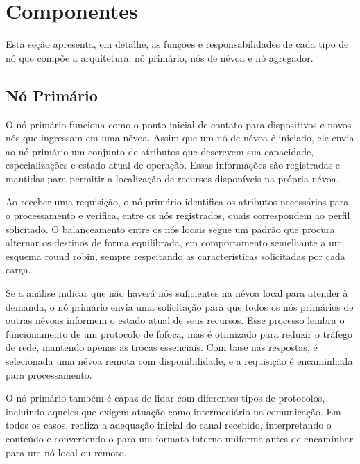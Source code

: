 \section{Componentes}

Esta seção apresenta, em detalhe, as funções e responsabilidades de cada tipo de nó que compõe a arquitetura: nó primário, nós de névoa e nó agregador.

\subsection{Nó Primário}

O nó primário funciona como o ponto inicial de contato para dispositivos e novos nós que ingressam em uma névoa. Assim que um nó de névoa é iniciado, ele envia ao nó primário um conjunto de atributos que descrevem sua capacidade, especializações e estado atual de operação. Essas informações são registradas e mantidas para permitir a localização de recursos disponíveis na própria névoa.

Ao receber uma requisição, o nó primário identifica os atributos necessários para o processamento e verifica, entre os nós registrados, quais correspondem ao perfil solicitado. O balanceamento entre os nós locais segue um padrão que procura alternar os destinos de forma equilibrada, em comportamento semelhante a um esquema round robin, sempre respeitando as características solicitadas por cada carga.

Se a análise indicar que não haverá nós suficientes na névoa local para atender à demanda, o nó primário envia uma solicitação para que todos os nós primários de outras névoas informem o estado atual de seus recursos. Esse processo lembra o funcionamento de um protocolo de fofoca, mas é otimizado para reduzir o tráfego de rede, mantendo apenas as trocas essenciais. Com base nas respostas, é selecionada uma névoa remota com disponibilidade, e a requisição é encaminhada para processamento.

O nó primário também é capaz de lidar com diferentes tipos de protocolos, incluindo aqueles que exigem atuação como intermediário na comunicação. Em todos os casos, realiza a adequação inicial do canal recebido, interpretando o conteúdo e convertendo-o para um formato interno uniforme antes de encaminhar para um nó local ou remoto.

